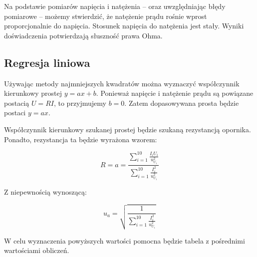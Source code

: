 \documentclass[a4paper]{article}
\newlength{\du}
\begin{document}
Na podstawie pomiarów napięcia i natężenia -- oraz uwzględniając błędy pomiarowe -- możemy stwierdzić, że natężenie prądu rośnie wprost proporcjonalnie do napięcia.
Stosunek napięcia do natężenia jest stały.
Wyniki doświadczenia potwierdzają słuszność prawa Ohma.

\subsection{Regresja liniowa}

Używając metody najmniejszych kwadratów można wyznaczyć współczynnik kierunkowy prostej $y = ax + b$.
Ponieważ napięcie i natężenie prądu są powiązane postacią $U = RI$, to przyjmujemy $b = 0$.
Zatem dopasowywana prosta będzie postaci $y = ax$.

Współczynnik kierunkowy szukanej prostej będzie szukaną rezystancją opornika. Ponadto, rezystancja ta będzie wyrażona wzorem:

$$R = a = \frac{\sum_{i = 1}^{10}\frac{I_i U_i}{u_{U_i}^2}}{\sum_{i = 1}^{10}\frac{I_i^2}{u_{U_i}^2}}$$

Z niepewnością wynoszącą:

$$u_a = \sqrt{\frac{1}{\sum_{i = 1}^{10}\frac{I_i^2}{u_{U_i}^2}}}$$

W celu wyznaczenia powyższych wartości pomocna będzie tabela z pośrednimi wartościami obliczeń.
\end{document}
